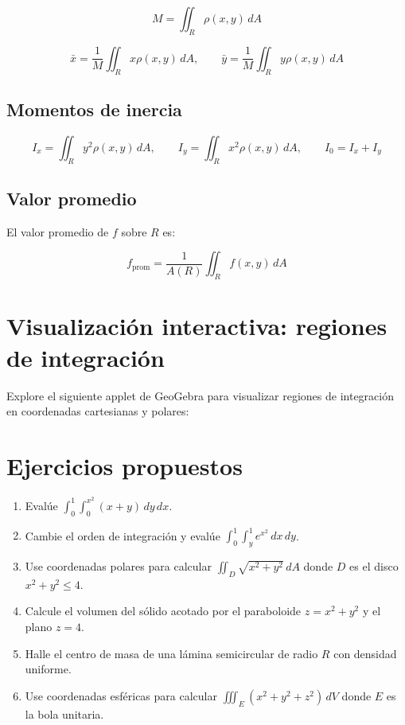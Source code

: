 \documentclass[
]{book}
\providecommand{\tightlist}{%
  \setlength{\itemsep}{0pt}\setlength{\parskip}{0pt}}
\begin{document}
\[
M = \iint_R \rho(x, y) \, dA
\]

\[
\bar{x} = \frac{1}{M} \iint_R x \rho(x, y) \, dA, \qquad
\bar{y} = \frac{1}{M} \iint_R y \rho(x, y) \, dA
\]

\subsection{Momentos de inercia}\label{momentos-de-inercia}

\[
I_x = \iint_R y^2 \rho(x, y) \, dA, \qquad
I_y = \iint_R x^2 \rho(x, y) \, dA, \qquad
I_0 = I_x + I_y
\]

\subsection{Valor promedio}\label{valor-promedio}

El valor promedio de \(f\) sobre \(R\) es:

\[
f_{\text{prom}} = \frac{1}{A(R)} \iint_R f(x, y) \, dA
\]

\section{Visualización interactiva: regiones de integración}\label{visualizaciuxf3n-interactiva-regiones-de-integraciuxf3n}

Explore el siguiente applet de GeoGebra para visualizar regiones de integración en coordenadas cartesianas y polares:

\section{Ejercicios propuestos}\label{ejercicios-propuestos-6}

\begin{enumerate}
\def\labelenumi{\arabic{enumi}.}
\tightlist
\item
  Evalúe \(\int_0^1 \int_0^{x^2} (x + y) \, dy \, dx\).
\item
  Cambie el orden de integración y evalúe \(\int_0^1 \int_y^1 e^{x^2} \, dx \, dy\).
\item
  Use coordenadas polares para calcular \(\iint_D \sqrt{x^2 + y^2} \, dA\) donde \(D\) es el disco \(x^2 + y^2 \leq 4\).
\item
  Calcule el volumen del sólido acotado por el paraboloide \(z = x^2 + y^2\) y el plano \(z = 4\).
\item
  Halle el centro de masa de una lámina semicircular de radio \(R\) con densidad uniforme.
\item
  Use coordenadas esféricas para calcular \(\iiint_E (x^2 + y^2 + z^2) \, dV\) donde \(E\) es la bola unitaria.
\end{enumerate}
\end{document}
